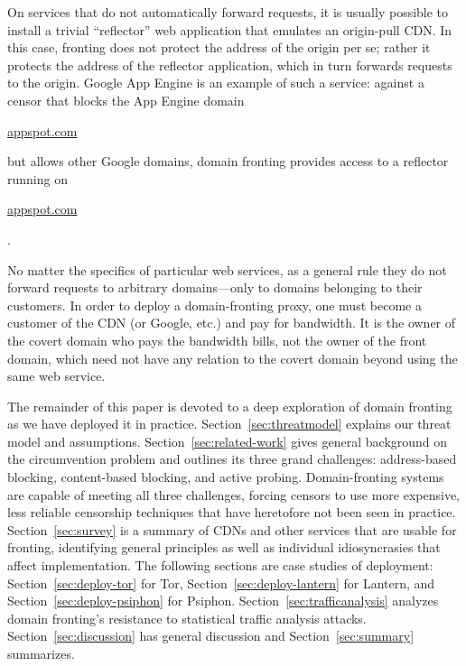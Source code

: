 \documentclass{sig-alternate}
\def\urll#1{\begin{NoHyper}\url{#1}\end{NoHyper}}
\begin{document}
On services that do not automatically forward requests,
it is usually possible to install a trivial ``reflector'' web application
that emulates an origin-pull CDN.
In this case, fronting does not protect the address of the origin per se;
rather it protects the address of the reflector application,
which in turn forwards requests to the origin.
Google App Engine is an example of such a service:
against a censor that blocks the App Engine domain \urll{appspot.com}
but allows other Google domains,
domain fronting provides access to a reflector running on \urll{appspot.com}.

No matter the specifics of particular web services,
as a general rule they do not forward requests to arbitrary domains---only to domains
belonging to their customers.
In order to deploy a domain-fronting proxy,
one must become a customer of the CDN (or Google, etc.)
and pay for bandwidth.
It is the owner of the covert domain who pays the bandwidth bills,
not the owner of the front domain,
which need not have any relation to the covert domain beyond
using the same web service.

The remainder of this paper is devoted to a deep exploration of
domain fronting as we have deployed it in practice.
Section~\ref{sec:threatmodel} explains our threat model and assumptions.
Section~\ref{sec:related-work} gives general background on the circumvention problem
and outlines its three grand challenges:
address-based blocking, content-based blocking, and active probing.
Domain-fronting systems are capable of meeting all three challenges,
forcing censors to use more expensive, less reliable censorship techniques
that have heretofore not been seen in practice.
Section~\ref{sec:survey} is a summary of CDNs and other services
that are usable for fronting,
identifying general principles as well as
individual idiosyncrasies that affect implementation.
The following sections are case studies of deployment:
Section~\ref{sec:deploy-tor} for Tor,
Section~\ref{sec:deploy-lantern} for Lantern, and
Section~\ref{sec:deploy-psiphon} for Psiphon.
Section~\ref{sec:trafficanalysis} analyzes domain fronting's resistance
to statistical traffic analysis attacks.
Section~\ref{sec:discussion} has general discussion and
Section~\ref{sec:summary} summarizes.

\end{document}
